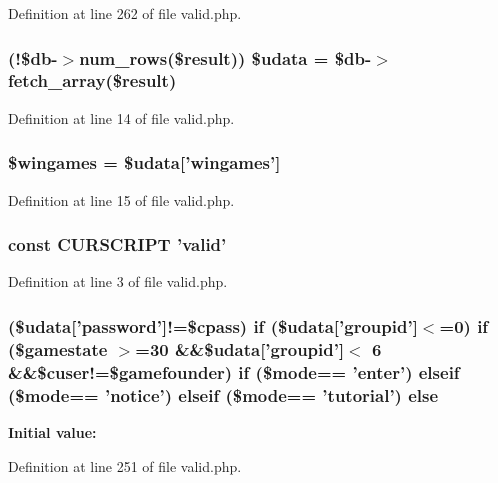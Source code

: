 Definition at line 262 of file valid.\+php.

\hypertarget{valid_8php_aa64a6e7c321a5fc5c5089fc201f285cb}{
\subsubsection[{\$udata}]{ (!\$db-\/$>$num\+\_\+rows(\${\bf result})) \$udata = \$db-\/$>$fetch\+\_\+array(\${\bf result})}}\label{valid_8php_aa64a6e7c321a5fc5c5089fc201f285cb}


Definition at line 14 of file valid.\+php.

\hypertarget{valid_8php_aacaeb07af0678af177be3eebd652f775}{
\subsubsection[{\$wingames}]{\setlength{\rightskip}{0pt plus 5cm}\$wingames = \$udata\mbox{[}'wingames'\mbox{]}}}\label{valid_8php_aacaeb07af0678af177be3eebd652f775}


Definition at line 15 of file valid.\+php.

\hypertarget{valid_8php_a39c39f525eceb86cabc338804f230e80}{
\subsubsection[{C\+U\+R\+S\+C\+R\+I\+P\+T}]{\setlength{\rightskip}{0pt plus 5cm}const C\+U\+R\+S\+C\+R\+I\+P\+T 'valid'}}\label{valid_8php_a39c39f525eceb86cabc338804f230e80}


Definition at line 3 of file valid.\+php.

\hypertarget{valid_8php_a227e6cec8cb6be0e42771a246a107c95}{
\subsubsection[{else}]{ (\$udata\mbox{[}'password'\mbox{]}!=\$cpass) {\bf if} (\$udata\mbox{[}'groupid'\mbox{]}$<$=0) {\bf if} (\$gamestate $>$=30 \&\&\$udata\mbox{[}'groupid'\mbox{]}$<$ 6 \&\&\$cuser!=\$gamefounder) {\bf if} (\$mode== 'enter') {\bf elseif} (\$mode== 'notice') {\bf elseif} (\$mode== 'tutorial') else}}\label{valid_8php_a227e6cec8cb6be0e42771a246a107c95}
{\bfseries Initial value\+:}


Definition at line 251 of file valid.\+php.

